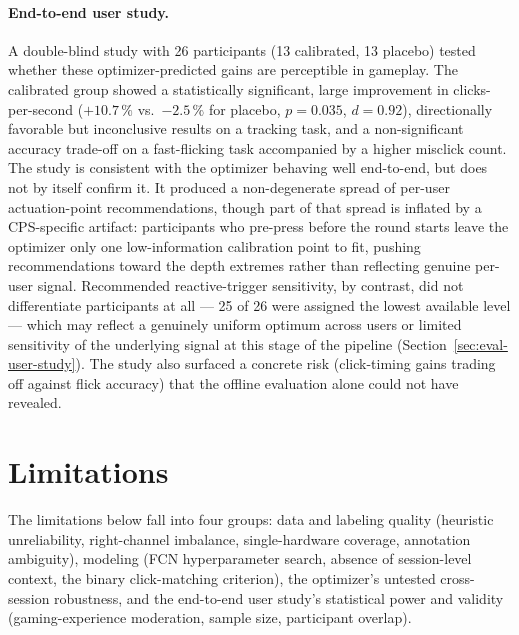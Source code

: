 \paragraph{End-to-end user study.}
A double-blind study with 26 participants (13 calibrated, 13 placebo) tested
whether these optimizer-predicted gains are perceptible in gameplay. The
calibrated group
showed a statistically significant, large improvement in clicks-per-second
($+10.7\,\%$ vs.\ $-2.5\,\%$ for placebo, $p=0.035$, $d=0.92$), directionally
favorable but inconclusive results on a tracking task, and a non-significant
accuracy trade-off on a fast-flicking task accompanied by a higher misclick count.
The study is consistent with the optimizer behaving well end-to-end, but does not
by itself confirm it. It produced a non-degenerate spread of per-user
actuation-point recommendations, though part of that spread is inflated by a
CPS-specific artifact: participants who pre-press before the round starts leave
the optimizer only one low-information calibration point to fit, pushing
recommendations toward the depth extremes rather than reflecting genuine
per-user signal. Recommended reactive-trigger sensitivity, by contrast, did not
differentiate participants at all --- 25 of 26 were assigned the lowest
available level --- which may reflect a genuinely uniform optimum across users
or limited sensitivity of the underlying signal at this stage of the pipeline
(Section~\ref{sec:eval-user-study}). The study also surfaced a
concrete risk (click-timing gains trading off against flick accuracy) that the
offline evaluation alone could not have revealed.

\section{Limitations}
\label{sec:conclusion-lim}

The limitations below fall into four groups: data and labeling quality (heuristic
unreliability, right-channel imbalance, single-hardware coverage, annotation
ambiguity), modeling (FCN hyperparameter search, absence of session-level context,
the binary click-matching criterion), the optimizer's untested cross-session
robustness, and the end-to-end user study's statistical power and validity
(gaming-experience moderation, sample size, participant overlap).

